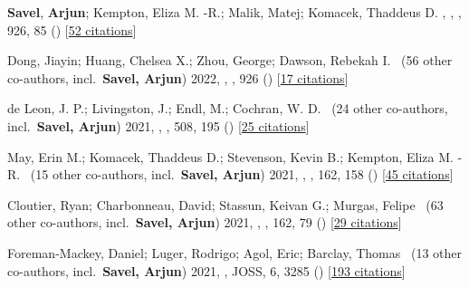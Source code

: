 \item[{\color{numcolor}\scriptsize9}] \textbf{Savel}, \textbf{Arjun}; Kempton, Eliza M. -R.; Malik, Matej; Komacek, Thaddeus D. , , \apj, {926}, 85 () [\href{https://ui.adsabs.harvard.edu/abs/2022ApJ...926...85S}{52 citations}]

\item[{\color{numcolor}\scriptsize8}] Dong, Jiayin; Huang, Chelsea X.; Zhou, George; Dawson, Rebekah I. \etal\ ({56} other co-authors, incl.\ \textbf{Savel, Arjun}) 2022, , \apj, {926} () [\href{https://ui.adsabs.harvard.edu/abs/2022ApJ...926L...7D}{17 citations}]

\item[{\color{numcolor}\scriptsize7}] de Leon, J. P.; Livingston, J.; Endl, M.; Cochran, W. D. \etal\ ({24} other co-authors, incl.\ \textbf{Savel, Arjun}) 2021, , \mnras, {508}, 195 () [\href{https://ui.adsabs.harvard.edu/abs/2021MNRAS.508..195D}{25 citations}]

\item[{\color{numcolor}\scriptsize6}] May, Erin M.; Komacek, Thaddeus D.; Stevenson, Kevin B.; Kempton, Eliza M. -R. \etal\ ({15} other co-authors, incl.\ \textbf{Savel, Arjun}) 2021, , \aj, {162}, 158 () [\href{https://ui.adsabs.harvard.edu/abs/2021AJ....162..158M}{45 citations}]

\item[{\color{numcolor}\scriptsize5}] Cloutier, Ryan; Charbonneau, David; Stassun, Keivan G.; Murgas, Felipe \etal\ ({63} other co-authors, incl.\ \textbf{Savel, Arjun}) 2021, , \aj, {162}, 79 () [\href{https://ui.adsabs.harvard.edu/abs/2021AJ....162...79C}{29 citations}]

\item[{\color{numcolor}\scriptsize4}] Foreman-Mackey, Daniel; Luger, Rodrigo; Agol, Eric; Barclay, Thomas \etal\ ({13} other co-authors, incl.\ \textbf{Savel, Arjun}) 2021, , JOSS, {6}, 3285 () [\href{https://ui.adsabs.harvard.edu/abs/2021JOSS....6.3285F}{193 citations}]

